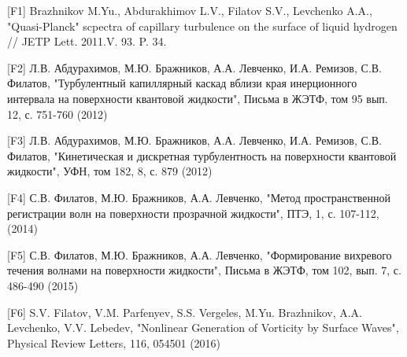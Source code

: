 \clearpage                                  %



[F1] Brazhnikov M.Yu., Abdurakhimov L.V., Filatov S.V., Levchenko A.A., "Quasi-Planck" scpectra of capillary turbulence on the surface of liquid hydrogen // JETP Lett. 2011.V. 93. P. 34.

[F2] Л.В. Абдурахимов, М.Ю. Бражников, А.А. Левченко, И.А. Ремизов, С.В. Филатов, "Турбулентный капиллярный каскад вблизи края инерционного интервала на поверхности квантовой жидкости", Письма в ЖЭТФ, том 95 вып. 12, с. 751-760 (2012)

[F3] Л.В. Абдурахимов, М.Ю. Бражников, А.А. Левченко, И.А. Ремизов, С.В. Филатов, "Кинетическая и дискретная турбулентность на поверхности квантовой жидкости", УФН, том 182, 8, с. 879 (2012)

[F4] С.В. Филатов, М.Ю. Бражников, А.А. Левченко, "Метод пространственной регистрации волн на поверхности прозрачной жидкости", ПТЭ, 1, с. 107-112, (2014)

[F5] С.В. Филатов, М.Ю. Бражников, А.А. Левченко, "Формирование вихревого течения волнами на поверхности жидкости", Письма в ЖЭТФ, том 102, вып. 7, с. 486-490 (2015)

[F6] S.V. Filatov, V.M. Parfenyev, S.S. Vergeles, M.Yu. Brazhnikov, A.A. Levchenko, V.V. Lebedev, "Nonlinear Generation of Vorticity by Surface Waves", Physical Review Letters, 116, 054501 (2016)

